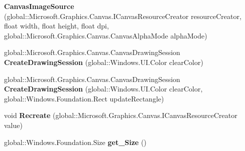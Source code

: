 \begin{DoxyCompactItemize}
\item 
\mbox{\label{class_microsoft_1_1_graphics_1_1_canvas_1_1_u_i_1_1_xaml_1_1_canvas_image_source_af7653cd38e9fa993c395e9aab7f32134}} 
{\bfseries Canvas\+Image\+Source} (global\+::\+Microsoft.\+Graphics.\+Canvas.\+I\+Canvas\+Resource\+Creator resource\+Creator, float width, float height, float dpi, global\+::\+Microsoft.\+Graphics.\+Canvas.\+Canvas\+Alpha\+Mode alpha\+Mode)
\item 
\mbox{\label{class_microsoft_1_1_graphics_1_1_canvas_1_1_u_i_1_1_xaml_1_1_canvas_image_source_a4252f5557def050fbeabcb6a457d4ec6}} 
global\+::\+Microsoft.\+Graphics.\+Canvas.\+Canvas\+Drawing\+Session {\bfseries Create\+Drawing\+Session} (global\+::\+Windows.\+U\+I.\+Color clear\+Color)
\item 
\mbox{\label{class_microsoft_1_1_graphics_1_1_canvas_1_1_u_i_1_1_xaml_1_1_canvas_image_source_ad904cc5b67ec7ea96ba67d9e7f9a7392}} 
global\+::\+Microsoft.\+Graphics.\+Canvas.\+Canvas\+Drawing\+Session {\bfseries Create\+Drawing\+Session} (global\+::\+Windows.\+U\+I.\+Color clear\+Color, global\+::\+Windows.\+Foundation.\+Rect update\+Rectangle)
\item 
\mbox{\label{class_microsoft_1_1_graphics_1_1_canvas_1_1_u_i_1_1_xaml_1_1_canvas_image_source_a0887999c04835ece8f184cdbf85b60be}} 
void {\bfseries Recreate} (global\+::\+Microsoft.\+Graphics.\+Canvas.\+I\+Canvas\+Resource\+Creator value)
\item 
\mbox{\label{class_microsoft_1_1_graphics_1_1_canvas_1_1_u_i_1_1_xaml_1_1_canvas_image_source_af6b41894fff7260ce3d135535154a2f8}} 
global\+::\+Windows.\+Foundation.\+Size {\bfseries get\+\_\+\+Size} ()
\item 
\mbox{\label{class_microsoft_1_1_graphics_1_1_canvas_1_1_u_i_1_1_xaml_1_1_canvas_image_source_a72c58fbab36a0813c0b2a0ad322cda40}} 

\end{DoxyCompactItemize}
